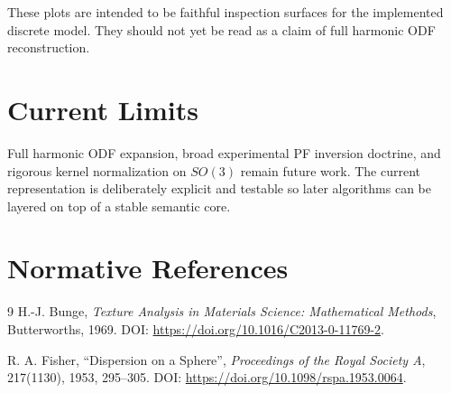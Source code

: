 \documentclass[11pt]{article}
\begin{document}
These plots are intended to be faithful inspection surfaces for the implemented discrete model. They
should not yet be read as a claim of full harmonic ODF reconstruction.

\section{Current Limits}

Full harmonic ODF expansion, broad experimental PF inversion doctrine, and rigorous kernel normalization on $SO(3)$ remain future work. The current representation is deliberately explicit and testable so later algorithms can be layered on top of a stable semantic core.

\section{Normative References}

\begin{thebibliography}{9}
H.-J. Bunge,
\textit{Texture Analysis in Materials Science: Mathematical Methods},
Butterworths, 1969.
DOI: \url{https://doi.org/10.1016/C2013-0-11769-2}.

R. A. Fisher,
``Dispersion on a Sphere'',
\textit{Proceedings of the Royal Society A}, 217(1130), 1953, 295--305.
DOI: \url{https://doi.org/10.1098/rspa.1953.0064}.
\end{thebibliography}
\end{document}
